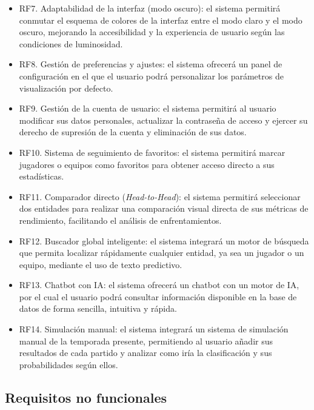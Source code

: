 \begin{itemize}
    \item RF7. Adaptabilidad de la interfaz (modo oscuro): el sistema permitirá conmutar el esquema de colores de la interfaz entre el modo claro y el modo oscuro, mejorando la accesibilidad y la experiencia de usuario según las condiciones de luminosidad.

    \item RF8. Gestión de preferencias y ajustes: el sistema ofrecerá un panel de configuración en el que el usuario podrá personalizar  los parámetros de visualización por defecto.

    \item RF9. Gestión de la cuenta de usuario: el sistema permitirá al usuario modificar sus datos personales, actualizar la contraseña de acceso y ejercer su derecho de supresión de la cuenta y eliminación de sus datos.

    \item RF10. Sistema de seguimiento de favoritos: el sistema permitirá marcar jugadores o equipos como favoritos para obtener acceso directo a sus estadísticas.

    \item RF11. Comparador directo (\textit{Head-to-Head}): el sistema permitirá seleccionar dos entidades para realizar una comparación visual directa de sus métricas de rendimiento, facilitando el análisis de enfrentamientos.

    \item RF12. Buscador global inteligente: el sistema integrará un motor de búsqueda que permita localizar rápidamente cualquier entidad, ya sea un jugador o un equipo, mediante el uso de texto predictivo.

    \item RF13. Chatbot con IA: el sistema ofrecerá un chatbot con un motor de IA, por el cual el usuario podrá consultar información disponible en la base de datos de forma sencilla, intuitiva y rápida.
    
    \item RF14. Simulación manual: el sistema integrará un sistema de simulación manual de la temporada presente, permitiendo al usuario añadir sus resultados de cada partido y analizar como iría la clasificación y sus probabilidades según ellos.

\end{itemize}


\subsection{Requisitos no funcionales}

